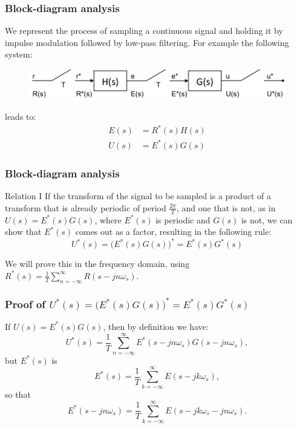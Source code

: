 \begin{frame}
	\frametitle{Block-diagram analysis}
	\justify
	We represent the process of sampling a continuous signal and holding it by impulse modulation followed by low-pass filtering. For example the following system: 
	\vspace{1em}
	\begin{figure}
		\centering
		\includegraphics[width=1\linewidth]{block_analysis_1}
		\vspace{0.5em}
	\end{figure}
	leads to:
	\begin{equation}
		\begin{split}
		E(s) &= R^{*}(s)H(s)\\
		U(s) &= E^{*}(s)G(s)
		\end{split}
	\end{equation}
\end{frame}

\begin{frame}
	\frametitle{Block-diagram analysis}
	\begin{block}{Relation I}
		\justify
		If the transform of the signal to be sampled is a product of a transform that is already periodic of period $\frac{2\pi}{T}$, and one that is not, as in $U(s) = E^{*}(s)G(s)$, where $E^{*}(s)$ is periodic and $G(s)$ is not, we can show that $E^{*}(s)$ comes out as a factor, resulting in the following rule: 
		\begin{equation}
		U^{*}(s) = \big(E^{*}(s)G(s)\big)^{*} = E^{*}(s)G^{*}(s)
		\end{equation}
	\end{block}
	\vspace{1em}
	We will prove this in the frequency domain, using $R^*(s)=\frac{1}{T}\sum_{n=-\infty}^{\infty}R(s-jn\omega_s)$.\\
\end{frame}

\begin{frame}
	\frametitle{Proof of $U^{*}(s) = \big(E^{*}(s)G(s)\big)^{*} = E^{*}(s)G^{*}(s)$}
	If $U(s) = E^{*}(s)G(s)$, then by definition we have:
	\begin{equation}
	U^{*}(s) = \frac{1}{T} \sum_{n=-\infty}^{\infty} E^{*}(s - jn\omega_s)G(s - jn\omega_s),
	\end{equation}
	but $E^{*}(s)$ is
	\begin{equation}
	E^{*}(s) = \frac{1}{T} \sum_{k=-\infty}^{\infty} E(s-jk\omega_s),
	\end{equation}
	so that
	\begin{equation}
	E^{*}(s-jn\omega_s) = \frac{1}{T} \sum_{k=-\infty}^{\infty} E(s - jk\omega_s - jn\omega_s).
	\end{equation}
\end{frame}

